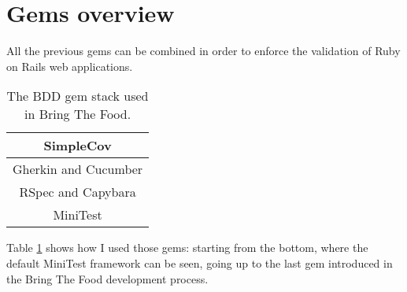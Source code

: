 \section{Gems overview}

All the previous gems can be combined in order to enforce the validation of Ruby on Rails web applications.

\begin{table}[h!]
	\vspace{0.2cm}
	\renewcommand*\arraystretch{1.5}
	\begin{center}
	\begin{tabular}{|c|}
		\hline
		SimpleCov \\ \hline
		Gherkin and Cucumber \\ \hline
		RSpec and Capybara \\ \hline
		MiniTest \\ \hline
	\end{tabular}
	\vspace{0.2cm}
	\caption{The BDD gem stack used in Bring The Food.}
	\label{table:structureofgems}
	\end{center}
\end{table}

Table \ref{table:structureofgems} shows how I used those gems: starting from the bottom, where the default MiniTest framework can be seen, going up to the last gem introduced in the Bring The Food development process.

